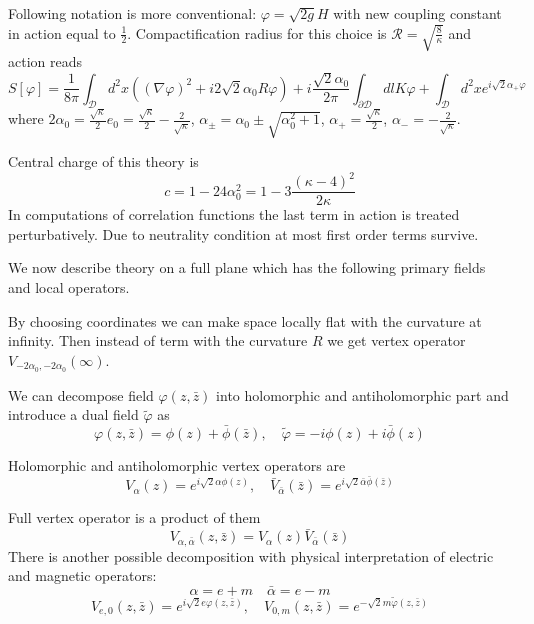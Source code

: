 \documentclass[12pt]{article}
\begin{document}
Following notation is more conventional:
$\varphi=\sqrt{2g}H$ with new coupling constant in action equal to $\frac{1}{2}$. Compactification
radius for this choice is $\mathcal{R}=\sqrt{\frac{8}{\kappa}}$ and action reads
\begin{equation}
  \label{eq:129}
  S[\varphi]=\frac{1}{8\pi}\int_{\mathcal{D}}d^{2}x ((\nabla \varphi)^{2} + i2\sqrt{2} \alpha_{0}
  R\varphi)+i\frac{\sqrt{2}\alpha_{0}}{2\pi} \int_{\partial\mathcal{D}} dl
  K\varphi+\int_{\mathcal{D}}d^{2}x e^{i\sqrt{2}\alpha_{+}\varphi}
\end{equation}
where $2\alpha_{0}=\frac{\sqrt{\kappa}}{2}e_{0}=\frac{\sqrt{\kappa}}{2}-\frac{2}{\sqrt{\kappa}}$,
$\alpha_{\pm}=\alpha_{0}\pm\sqrt{\alpha_{0}^{2}+1}$, $\alpha_{+}=\frac{\sqrt{\kappa}}{2}$,
$\alpha_{-}=-\frac{2}{\sqrt{\kappa}}$. 

Central charge of this theory is
\begin{equation}
  \label{eq:130}
  c=1-24\alpha_{0}^{2}=1-3\frac{(\kappa-4)^{2}}{2\kappa}
\end{equation}
In computations of correlation functions the last term in action is treated perturbatively. Due to
neutrality condition at most first order terms survive. 

We now describe theory on a full plane which has the following primary fields and local operators. 

By choosing coordinates we can make space locally flat with the curvature at infinity. Then instead
of term with the curvature $R$ we get vertex operator $V_{-2\alpha_{0},-2\alpha_{0}}(\infty)$.

We can decompose field $\varphi(z,\bar z)$ into holomorphic and antiholomorphic part and introduce a
dual field $\tilde\varphi$ as
\begin{equation}
  \label{eq:131}
  \varphi(z,\bar z)=\phi(z)+\bar\phi(\bar z),\quad \tilde\varphi=-i\phi(z)+i\bar\phi(z)
\end{equation}

Holomorphic and antiholomorphic vertex operators are
\begin{equation}
  \label{eq:132}
  V_{\alpha}(z)=e^{i\sqrt{2}\alpha \phi(z)},\quad \bar V_{\bar\alpha}(\bar z)=e^{i\sqrt{2}\bar\alpha
    \bar \phi(\bar z)}
\end{equation}

Full vertex operator is a product of them
\begin{equation}
  \label{eq:133}
  V_{\alpha,\bar\alpha}(z,\bar z)=V_{\alpha}(z)\bar V_{\bar \alpha}(\bar z)
\end{equation}
There is another possible decomposition with physical interpretation of electric and magnetic operators:
\begin{equation}
  \label{eq:134}
  \alpha=e+m\quad \bar\alpha=e-m
\end{equation}
\begin{equation}
  \label{eq:135}
  V_{e,0}(z,\bar z)=e^{i\sqrt{2} e\varphi(z,\bar z)},\quad   V_{0,m}(z,\bar z)=e^{-\sqrt{2} m\tilde\varphi(z,\bar z)}
\end{equation}
\end{document}
